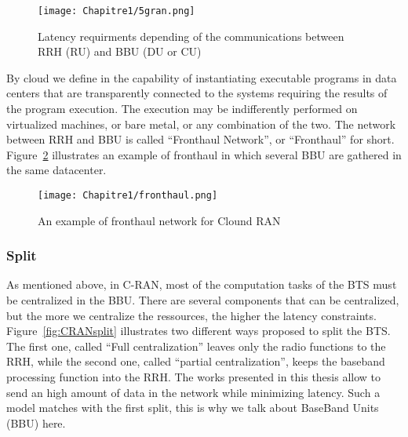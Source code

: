  \begin{figure}[h]
      \begin{center}
      \texttt{[image: Chapitre1/5gran.png]}
      \end{center}
      \caption{Latency requirments depending of the communications between RRH (RU) and BBU (DU or CU) }\label{fig:5gran}
      \end{figure}

By cloud we define in the capability of instantiating executable programs in data centers that are transparently connected to the systems requiring the results of the program execution.
 The execution may be indifferently performed on virtualized machines, or bare metal, or any combination of the two. The network between RRH and BBU is called “Fronthaul Network”, or “Fronthaul” for short. Figure~\ref{fig:fronthaul} illustrates an example of fronthaul in which several BBU are gathered in the same datacenter. 

  \begin{figure}[h]
      \begin{center}
      \texttt{[image: Chapitre1/fronthaul.png]}
      \end{center}
      \caption{An example of fronthaul network for Clound RAN}\label{fig:fronthaul}
      \end{figure}
      
      \subsubsection{Split}

      As mentioned above, in C-RAN, most of the computation tasks of the BTS must be centralized in the BBU. There are several components that can be centralized, but the more we centralize the ressources, the higher the latency constraints.
      Figure~\ref{fig:CRANsplit} illustrates two different ways proposed to split the BTS. The first one, called ``Full centralization'' leaves only the radio functions to the RRH, while the second one, called ``partial centralization'', keeps the baseband processing function into the RRH. The works presented in this thesis allow to send an high amount of data in the network while minimizing latency. Such a model matches with the first split, this is why we talk about BaseBand Units (BBU) here. 

